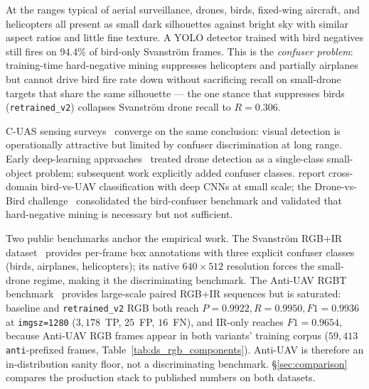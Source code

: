 At the ranges typical of aerial surveillance, drones, birds, fixed-wing aircraft, and helicopters all present as small dark silhouettes against bright sky with similar aspect ratios and little fine texture. A YOLO detector trained with bird negatives still fires on 94.4\% of bird-only Svanstr\"om frames. This is the \emph{confuser problem}: training-time hard-negative mining suppresses helicopters and partially airplanes but cannot drive bird fire rate down without sacrificing recall on small-drone targets that share the same silhouette --- the one stance that suppresses birds (\texttt{retrained\_v2}) collapses Svanstr\"om drone recall to $R=0.306$.

C-UAS sensing surveys~\cite{shi2018counteruas,taha2019drone,samaras2019deep} converge on the same conclusion: visual detection is operationally attractive but limited by confuser discrimination at long range. Early deep-learning approaches~\cite{aker2017using,rozantsev2017detecting} treated drone detection as a single-class small-object problem; subsequent work explicitly added confuser classes. \citet{schumann2017deep} report cross-domain bird-vs-UAV classification with deep CNNs at small scale; the Drone-vs-Bird challenge~\cite{coluccia2021dronevsbird} consolidated the bird-confuser benchmark and validated that hard-negative mining is necessary but not sufficient.

Two public benchmarks anchor the empirical work. The Svanstr\"om RGB+IR dataset~\cite{svanstrom2021real,svanstrom2022dronedataset} provides per-frame box annotations with three explicit confuser classes (birds, airplanes, helicopters); its native $640\times512$ resolution forces the small-drone regime, making it the discriminating benchmark. The Anti-UAV RGBT benchmark~\cite{jiang2021antiuav,zhao2023antiuav} provides large-scale paired RGB+IR sequences but is saturated: baseline and \texttt{retrained\_v2} RGB both reach $P=0.9922, R=0.9950, F1=0.9936$ at \texttt{imgsz=1280} ($3{,}178$~TP, $25$~FP, $16$~FN), and IR-only reaches $F1=0.9654$, because Anti-UAV RGB frames appear in both variants' training corpus ($59{,}413$ \texttt{anti}-prefixed frames, Table~\ref{tab:ds_rgb_components}). Anti-UAV is therefore an in-distribution sanity floor, not a discriminating benchmark. \S\ref{sec:comparison} compares the production stack to published numbers on both datasets.

